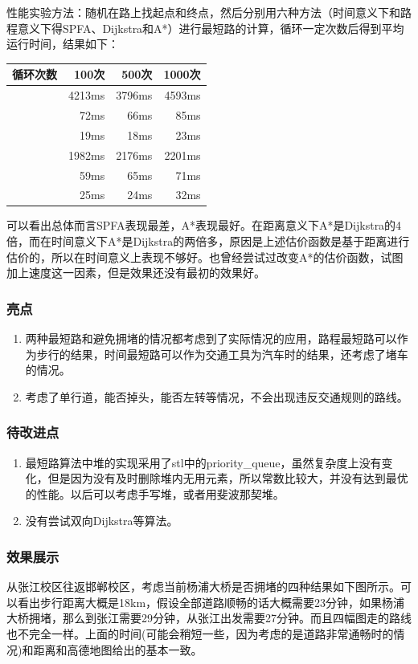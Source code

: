 \documentclass[10pt]{scrartcl}
\begin{document}
性能实验方法：随机在路上找起点和终点，然后分别用六种方法（时间意义下和路程意义下得SPFA、Dijkstra和A*）进行最短路的计算，循环一定次数后得到平均运行时间，结果如下：

\begin{tabular}{|l|r|r|r|}
\hline
循环次数    & 100次  & 500次   & 1000次 \\
\hline
[SPFADist] & 4213ms & 3796ms  & 4593ms \\
\hline
[DijkDist] & 72ms   & 66ms    & 85ms \\
\hline
[A*  Dist] & 19ms   & 18ms    & 23ms \\
\hline
[SPFATime] & 1982ms & 2176ms  & 2201ms \\
\hline
[DijkTime] & 59ms   & 65ms    & 71ms \\
\hline
[A*  Time] & 25ms   & 24ms    & 32ms \\
\hline
\end{tabular}

可以看出总体而言SPFA表现最差，A*表现最好。在距离意义下A*是Dijkstra的4倍，而在时间意义下A*是Dijkstra的两倍多，原因是上述估价函数是基于距离进行估价的，所以在时间意义上表现不够好。也曾经尝试过改变A*的估价函数，试图加上速度这一因素，但是效果还没有最初的效果好。

\subsubsection{亮点}
\begin{enumerate}
\item 两种最短路和避免拥堵的情况都考虑到了实际情况的应用，路程最短路可以作为步行的结果，时间最短路可以作为交通工具为汽车时的结果，还考虑了堵车的情况。
\item 考虑了单行道，能否掉头，能否左转等情况，不会出现违反交通规则的路线。
\end{enumerate}

\subsubsection{待改进点}
\begin{enumerate}
\item 最短路算法中堆的实现采用了stl中的priority\_queue，虽然复杂度上没有变化，但是因为没有及时删除堆内无用元素，所以常数比较大，并没有达到最优的性能。以后可以考虑手写堆，或者用斐波那契堆。
\item 没有尝试双向Dijkstra等算法。
\end{enumerate}

\subsubsection{效果展示}
从张江校区往返邯郸校区，考虑当前杨浦大桥是否拥堵的四种结果如下图所示。可以看出步行距离大概是18km，假设全部道路顺畅的话大概需要23分钟，如果杨浦大桥拥堵，那么到张江需要29分钟，从张江出发需要27分钟。而且四幅图走的路线也不完全一样。上面的时间(可能会稍短一些，因为考虑的是道路非常通畅时的情况)和距离和高德地图给出的基本一致。
\end{document}
